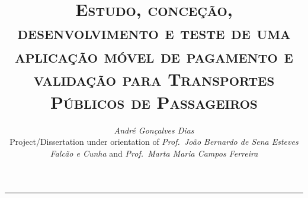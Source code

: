 \documentclass[9pt,a4paper]{extarticle}
\begin{document}
\title{\vspace*{-8mm}\textbf{\textsc{Estudo, conceção, desenvolvimento e teste de uma aplicação móvel de pagamento e validação para Transportes Públicos de Passageiros}}}
\author{\emph{André Gonçalves Dias}\\[2mm]
\small{Project/Dissertation under orientation of \emph{Prof.\ João Bernardo de Sena Esteves Falcão e Cunha} and \emph{Prof.\ Marta Maria Campos Ferreira}}}
\date{}
\maketitle
\thispagestyle{empty}

\vspace*{-4mm}\noindent\rule{\textwidth}{0.4pt}\vspace*{4mm}
\end{document}
